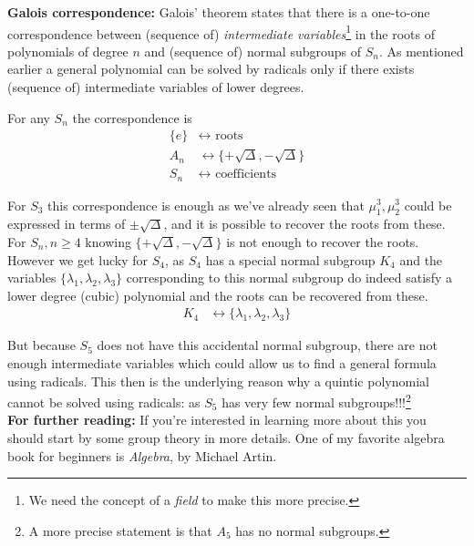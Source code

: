 \newpage 
\noindent \textbf{Galois correspondence: } Galois' theorem states that there is a one-to-one correspondence between (sequence of) \emph{intermediate variables}\footnote{We need the concept of a \emph{field} to make this more precise.} in the roots of polynomials of degree $ n$ and (sequence of) normal subgroups of $ S_n$. As mentioned earlier a {general} polynomial can be solved by radicals only if there exists (sequence of) intermediate variables of lower degrees. 

For any $ S_n$ the correspondence is
\begin{align*}
  \{ e \} & \leftrightarrow  \mbox{ roots }   \\
  A_n & \leftrightarrow \{ +\sqrt{\Delta}, -\sqrt{\Delta} \} \\
  S_n & \leftrightarrow \mbox{ coefficients }
\end{align*}


For $ S_3$ this correspondence is enough as we've already seen that $ \mu_1^3, \mu_2^3$ could be expressed in terms of $ \pm \sqrt{\Delta} $, and it is possible to recover the roots from these.\\

For $ S_n, n \ge 4$ knowing $ \{ +\sqrt{\Delta}, -\sqrt{\Delta} \} $ is not enough to recover the roots.\\

However we get lucky for $ S_4$, as $ S_4$ has a special normal subgroup $ K_4$ and the variables $ \{ \lambda_1, \lambda_2, \lambda_3 \}$ corresponding to this normal subgroup do indeed satisfy a lower degree (cubic) polynomial and the roots can be recovered from these.
\begin{align*}
  K_4 & \leftrightarrow \{ \lambda_1, \lambda_2, \lambda_3 \}
\end{align*}

But because $ S_5$ does not have this accidental normal subgroup, there are not enough intermediate variables which could allow us to find a general formula using radicals. This then is the underlying reason why a quintic polynomial cannot be solved using radicals: as $ S_5$ has very few normal subgroups!!!\footnote{A more precise statement is that $ A_5$ has no normal subgroups.}\\

\noindent \textbf{For further reading:} If you're interested in learning more about this you should start by some group theory in more details. One of my favorite algebra book for beginners is \emph{Algebra}, by Michael Artin.

